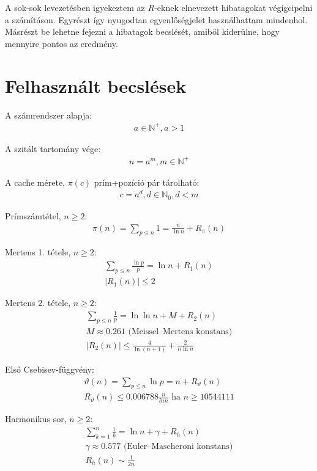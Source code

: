 \documentclass{article}
\begin{document}
A sok-sok levezetésben igyekeztem az $R$-eknek elnevezett hibatagokat végigcipelni a számításon.
Egyrészt így nyugodtan egyenlőségjelet használhattam mindenhol.
Másrészt be lehetne fejezni a hibatagok becslését, amiből kiderülne, hogy mennyire pontos az eredmény.

\section{Felhasznált becslések}

A számrendszer alapja:
\begin{align*}
a \in \mathbb{N}^{+}, a > 1
\end{align*}

A szitált tartomány vége:
\begin{align*}
n = a^m, m \in \mathbb{N}^{+}
\end{align*}

A cache mérete, $\pi(c)$ prím+pozíció pár tárolható:
\begin{align*}
c = a^d, d \in \mathbb{N}_{0}, d < m
\end{align*}

Prímszámtétel, $n \ge 2$:
\begin{align*}
\pi(n) = \sum_{p \le n} 1 = \frac{n}{\ln{n}} + R_{\pi}(n)
\end{align*}

Mertens 1. tétele, $n \ge 2$:
\begin{align*}
\sum_{p \le n} \frac{\ln{p}}{p} = \ln{n} + R_1(n) \\
\lvert R_1(n) \rvert \le 2
\end{align*}

Mertens 2. tétele, $n \ge 2$:
\begin{align*}
\sum_{p \le n} \frac{1}{p} = \ln{\ln{n}} + M + R_2(n) \\
M \approx 0.261 \text{ (Meissel–Mertens konstans)} \\
\lvert R_2(n) \rvert \le \frac{4}{\ln{(n+1)}} + \frac{2}{n \ln{n}}
\end{align*}

Első Csebisev-függvény:
\begin{align*}
\vartheta(n) = \sum_{p \le n} \ln{p} = n + R_{\vartheta}(n) \\
R_{\vartheta}(n) \le 0.006788 \frac{n}{ln{n}} \text{ ha } n \ge 10544111
\end{align*}

Harmonikus sor, $n \ge 2$:
\begin{align*}
\sum_{k=1}^{n} \frac{1}{k} = \ln{n} + \gamma + R_h(n) \\
\gamma \approx 0.577 \text{ (Euler–Mascheroni konstans)} \\
R_h(n) \sim \frac{1}{2n}
\end{align*}
\end{document}
